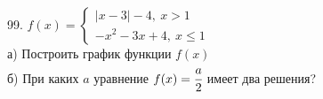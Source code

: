 99. $f(x)=\begin{cases} |x-3|-4,\ x>1\\ -x^2-3x+4,\ x\leqslant 1\end{cases}$\\
а) Построить график функции $f(x)$\\
б) При каких $a$ уравнение $f(x)=\cfrac{a}{2}$ имеет два решения?\\
